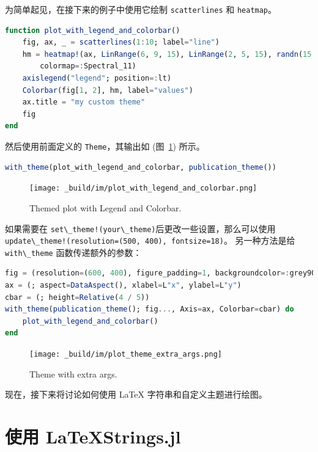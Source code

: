\documentclass[
  notoc %
]{tufte-book}
\newcommand{\passthrough}[1]{#1}
\begin{document}
为简单起见，在接下来的例子中使用它绘制
\passthrough{\lstinline!scatterlines!} 和
\passthrough{\lstinline!heatmap!}。

\begin{lstlisting}[language=Julia]
function plot_with_legend_and_colorbar()
    fig, ax, _ = scatterlines(1:10; label="line")
    hm = heatmap!(ax, LinRange(6, 9, 15), LinRange(2, 5, 15), randn(15, 15);
        colormap=:Spectral_11)
    axislegend("legend"; position=:lt)
    Colorbar(fig[1, 2], hm, label="values")
    ax.title = "my custom theme"
    fig
end
\end{lstlisting}

然后使用前面定义的 \passthrough{\lstinline!Theme!}，其输出如
(图~\ref{fig:plot_with_legend_and_colorbar}) 所示。

\begin{lstlisting}[language=Julia]
with_theme(plot_with_legend_and_colorbar, publication_theme())
\end{lstlisting}

\begin{figure}
\hypertarget{fig:plot_with_legend_and_colorbar}{%
\centering
\texttt{[image: \_build/im/plot\_with\_legend\_and\_colorbar.png]}
\caption{Themed plot with Legend and
Colorbar.}\label{fig:plot_with_legend_and_colorbar}
}
\end{figure}

如果需要在
\passthrough{\lstinline"set\_theme!(your\_theme)"}后更改一些设置，那么可以使用
\passthrough{\lstinline"update\_theme!(resolution=(500, 400), fontsize=18)"}。
另一种方法是给 \passthrough{\lstinline!with\_theme!}
函数传递额外的参数：

\begin{lstlisting}[language=Julia]
fig = (resolution=(600, 400), figure_padding=1, backgroundcolor=:grey90)
ax = (; aspect=DataAspect(), xlabel=L"x", ylabel=L"y")
cbar = (; height=Relative(4 / 5))
with_theme(publication_theme(); fig..., Axis=ax, Colorbar=cbar) do
    plot_with_legend_and_colorbar()
end
\end{lstlisting}

\begin{figure}
\hypertarget{fig:plot_theme_extra_args}{%
\centering
\texttt{[image: \_build/im/plot\_theme\_extra\_args.png]}
\caption{Theme with extra args.}\label{fig:plot_theme_extra_args}
}
\end{figure}

现在，接下来将讨论如何使用 LaTeX 字符串和自定义主题进行绘图。

\hypertarget{sec:using_latex}{%
\section{使用 LaTeXStrings.jl}\label{sec:using_latex}}
\end{document}
